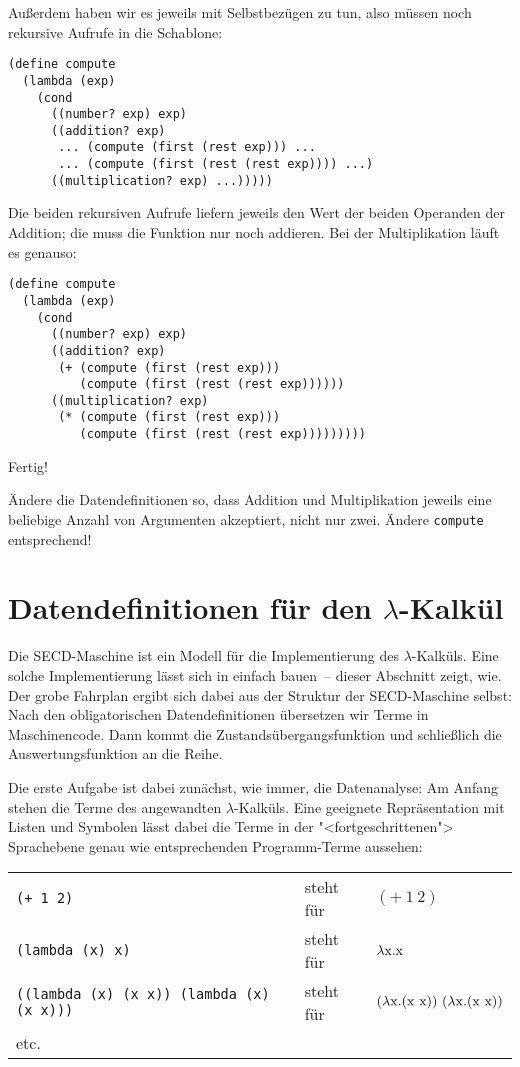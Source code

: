 %
Außerdem haben wir es jeweils mit Selbstbezügen zu tun, also müssen noch
rekursive Aufrufe in die Schablone:
%
\begin{lstlisting}
(define compute
  (lambda (exp)
    (cond
      ((number? exp) exp)
      ((addition? exp)
       ... (compute (first (rest exp))) ...
       ... (compute (first (rest (rest exp)))) ...)
      ((multiplication? exp) ...)))))
\end{lstlisting}
%
Die beiden rekursiven Aufrufe liefern jeweils den Wert der beiden
Operanden der Addition; die muss die Funktion nur noch addieren.  Bei
der Multiplikation läuft es genauso:
%
\begin{lstlisting}
(define compute
  (lambda (exp)
    (cond
      ((number? exp) exp)
      ((addition? exp)
       (+ (compute (first (rest exp)))
          (compute (first (rest (rest exp))))))
      ((multiplication? exp)
       (* (compute (first (rest exp)))
          (compute (first (rest (rest exp)))))))))
\end{lstlisting}
% 
Fertig!
%
\begin{aufgabeinline}
  Ändere die Datendefinitionen so, dass Addition und Multiplikation
  jeweils eine beliebige Anzahl von Argumenten akzeptiert, nicht nur
  zwei.  Ändere \lstinline{compute} entsprechend!
\end{aufgabeinline}

\section{Datendefinitionen für den $\lambda$-Kalkül}
\label{sec:datendefinitionen-lambda}

%
Die SECD-Maschine ist ein Modell für die Implementierung des
$\lambda$-Kalküls.  Eine solche Implementierung lässt sich in einfach
bauen~-- dieser Abschnitt zeigt, wie.  Der grobe Fahrplan ergibt sich
dabei aus der Struktur der SECD-Maschine selbst: Nach den
obligatorischen Datendefinitionen übersetzen wir Terme in
Maschinencode.  Dann kommt die Zustandsübergangsfunktion und
schließlich die Auswertungsfunktion an die Reihe.

Die erste Aufgabe ist dabei zunächst, wie immer, die Datenanalyse: Am
Anfang stehen die Terme des angewandten $\lambda$-Kalküls.  Eine
geeignete Repräsentation mit Listen und Symbolen lässt dabei die Terme
in der "<fortgeschrittenen"> Sprachebene genau wie entsprechenden
Programm-Terme aussehen:

\noindent\begin{tabular}{lll}
  \texttt{(+ 1 2)} & steht für & $(+~1~2)$\\
  \texttt{(lambda (x) x)} & steht für & $\lambda \mathrm x.\mathrm x$\\
  \texttt{((lambda (x) (x x)) (lambda (x) (x x)))} & steht für &
  $(\lambda \mathrm x.(\mathrm x~\mathrm x))~(\lambda \mathrm x.(\mathrm x~\mathrm x))$\\
  etc.
\end{tabular}

